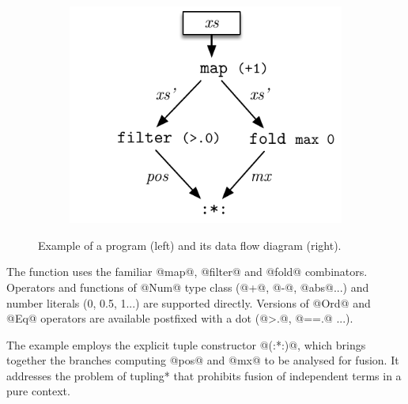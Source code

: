 \documentclass[preamble.tex]{subfiles}
\begin{document}
\begin{figure}
\begin{subfigure}{0.5\textwidth}
\end{subfigure}
%
\begin{subfigure}{.5\textwidth}%
\includegraphics[center,scale=\omniscale]{img/DFD-Flat-FilterMax}%
\end{subfigure}%

\caption{Example of a \LiveFusion program (left) and its data flow diagram (right).}
\label{fig:Flat-FilterMax}
\end{figure}

The function uses the familiar @map@, @filter@ and @fold@ combinators. Operators and functions of @Num@ type class (@+@, @-@, @abs@...) and number literals (0, 0.5, 1...) are supported directly. Versions of @Ord@ and @Eq@ operators are available postfixed with a dot (@>.@, @==.@ ...).

The example employs the explicit tuple constructor @(:*:)@, which brings together the branches computing @pos@ and @mx@ to be analysed for fusion. It addresses the problem of \*tupling* that prohibits fusion of independent terms in a pure context.
\end{document}
